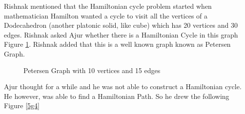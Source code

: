 Rishnak mentioned that the Hamiltonian cycle problem started
when mathematician Hamilton wanted a cycle to visit 
all the vertices of a Dodecahedron (another platonic solid, like cube) which has 20 vertices and 30 edges. 
Rishnak asked Ajur whether there is a Hamiltonian Cycle in this graph Figure \ref{5g3}. Rishnak added that this is a well known graph known as Petersen Graph.

\begin{figure}
\begin{center}
\caption{ Petersen Graph with 10 vertices and 15 edges }\label{5g3}
\end{center}
\end{figure}
Ajur thought for a while and he was not able to construct a Hamiltonian cycle. He however, was able to find a 
Hamiltonian Path. So he drew the following Figure \ref{5g4}


